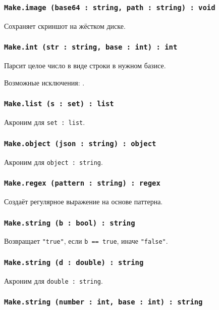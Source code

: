 \subsubsection{\lstinline|Make.image (base64 : string, path : string) : void|}

Сохраняет скриншот на жёстком диске.

\subsubsection{\lstinline|Make.int (str : string, base : int) : int|}

Парсит целое число в виде строки в нужном базисе.

Возможные исключения: .

\subsubsection{\lstinline|Make.list (s : set) : list|}

Акроним для \lstinline|set : list|.

\subsubsection{\lstinline|Make.object (json : string) : object|}

Акроним для \lstinline|object : string|.

\subsubsection{\lstinline|Make.regex (pattern : string) : regex|}

Создаёт регулярное выражение на основе паттерна.

\subsubsection{\lstinline|Make.string (b : bool) : string|}

Возвращает \lstinline|"true"|, если \lstinline|b == true|, иначе \lstinline|"false"|.

\subsubsection{\lstinline|Make.string (d : double) : string|}

Акроним для \lstinline|double : string|.

\subsubsection{\lstinline|Make.string (number : int, base : int) : string|}

